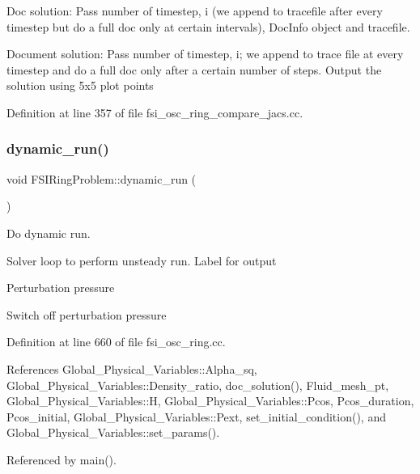 Doc solution\+: Pass number of timestep, i (we append to tracefile after every timestep but do a full doc only at certain intervals), Doc\+Info object and tracefile. 

Document solution\+: Pass number of timestep, i; we append to trace file at every timestep and do a full doc only after a certain number of steps. Output the solution using 5x5 plot points 

Definition at line 357 of file fsi\+\_\+osc\+\_\+ring\+\_\+compare\+\_\+jacs.\+cc.

\mbox{\label{classFSIRingProblem_acbb3bc5cd6d16cfee7a2f19a3b984ce7}} 
\subsubsection{\texorpdfstring{dynamic\+\_\+run()}{dynamic\_run()}\hspace{0.1cm}{\footnotesize\ttfamily [1/2]}}
{\footnotesize\ttfamily void F\+S\+I\+Ring\+Problem\+::dynamic\+\_\+run (\begin{DoxyParamCaption}{ }\end{DoxyParamCaption})}



Do dynamic run. 

Solver loop to perform unsteady run. Label for output

Perturbation pressure

Switch off perturbation pressure 

Definition at line 660 of file fsi\+\_\+osc\+\_\+ring.\+cc.



References Global\+\_\+\+Physical\+\_\+\+Variables\+::\+Alpha\+\_\+sq, Global\+\_\+\+Physical\+\_\+\+Variables\+::\+Density\+\_\+ratio, doc\+\_\+solution(), Fluid\+\_\+mesh\+\_\+pt, Global\+\_\+\+Physical\+\_\+\+Variables\+::H, Global\+\_\+\+Physical\+\_\+\+Variables\+::\+Pcos, Pcos\+\_\+duration, Pcos\+\_\+initial, Global\+\_\+\+Physical\+\_\+\+Variables\+::\+Pext, set\+\_\+initial\+\_\+condition(), and Global\+\_\+\+Physical\+\_\+\+Variables\+::set\+\_\+params().



Referenced by main().

\mbox{\label{classFSIRingProblem_ac679e3984b85ddec7b8c2e8ab4511eac}} 
